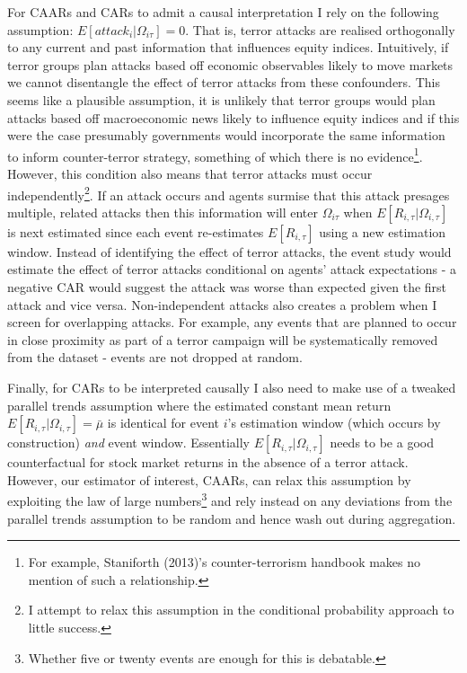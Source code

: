 \documentclass[]{AEA}
\begin{document}
For CAARs and CARs to admit a causal interpretation I rely on the
following assumption: \(E[\textit{attack}_i | \Omega_{i\tau}] = 0\).
That is, terror attacks are realised orthogonally to any current and
past information that influences equity indices. Intuitively, if terror
groups plan attacks based off economic observables likely to move
markets we cannot disentangle the effect of terror attacks from these
confounders. This seems like a plausible assumption, it is unlikely that
terror groups would plan attacks based off macroeconomic news likely to
influence equity indices and if this were the case presumably
governments would incorporate the same information to inform
counter-terror strategy, something of which there is no
evidence\footnote{For example, Staniforth (2013)'s counter-terrorism
  handbook makes no mention of such a relationship.}. However, this
condition also means that terror attacks must occur
independently\footnote{I attempt to relax this assumption in the
  conditional probability approach to little success.}. If an attack
occurs and agents surmise that this attack presages multiple, related
attacks then this information will enter \(\Omega_{i\tau}\) when
\(E[R_{i,\tau}\vert\Omega_{i,\tau}]\) is next estimated since each event
re-estimates \(E[R_{i,\tau}]\) using a new estimation window. Instead of
identifying the effect of terror attacks, the event study would estimate
the effect of terror attacks conditional on agents' attack expectations
- a negative CAR would suggest the attack was worse than expected given
the first attack and vice versa. Non-independent attacks also creates a
problem when I screen for overlapping attacks. For example, any events
that are planned to occur in close proximity as part of a terror
campaign will be systematically removed from the dataset - events are
not dropped at random.

Finally, for CARs to be interpreted causally I also need to make use of
a tweaked parallel trends assumption where the estimated constant mean
return \(E[R_{i,\tau}\vert\Omega_{i,\tau}] = \bar{\mu}\) is identical
for event \(i\)'s estimation window (which occurs by construction)
\textit{and} event window. Essentially
\(E[R_{i,\tau}\vert\Omega_{i,\tau}]\) needs to be a good counterfactual
for stock market returns in the absence of a terror attack. However, our
estimator of interest, CAARs, can relax this assumption by exploiting
the law of large numbers\footnote{Whether five or twenty events are
  enough for this is debatable.} and rely instead on any deviations from
the parallel trends assumption to be random and hence wash out during
aggregation.
\end{document}
